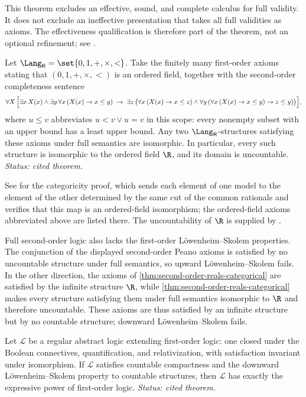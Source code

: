 This theorem excludes an effective, sound, and complete calculus for full
validity.  It does not exclude an ineffective presentation that takes all full
validities as axioms.  The effectiveness qualification is therefore part of
the theorem, not an optional refinement; see
\cite{BarwiseFeferman1985,Shapiro1991}.

\begin{theorem}
\label{thm:second-order-reals-categorical}
Let \(\Lang_{\mathsf R}=\set{0,1,+,\times,<}\).  Take the finitely many
first-order axioms stating that \((0,1,+,\times,<)\) is an ordered field,
together with the second-order completeness sentence
\[
  \forall X\,
  \Bigl[
    \exists x\,X(x)
    \land
    \exists y\,\forall x\,(X(x)\to x\le y)
    \;\to\;
    \exists z\,
    \bigl(
      \forall x\,(X(x)\to x\le z)
      \land
      \forall y\,(\forall x\,(X(x)\to x\le y)\to z\le y)
    \bigr)
  \Bigr],
\]
where \(u\le v\) abbreviates \(u<v\lor u=v\) in this scope: every nonempty
subset with an upper bound has a least upper bound.  Any two
\(\Lang_{\mathsf R}\)-structures satisfying these axioms under full
semantics are isomorphic.  In particular, every such structure is isomorphic
to the ordered field \(\R\), and its domain is uncountable.
\textit{Status: cited theorem.}
\end{theorem}

See \cite{Shapiro1991} for the categoricity proof, which sends each element
of one model to the element of the other determined by the same cut of the
common rationals and verifies that this map is an ordered-field isomorphism;
the ordered-field axioms abbreviated above are listed there.  The
uncountability of \(\R\) is supplied by \cite{Jech2003}.

Full second-order logic also lacks the first-order L\"owenheim--Skolem
properties.  The conjunction of the displayed second-order Peano axioms is
satisfied by no uncountable structure
under full semantics, so upward L\"owenheim--Skolem fails.  In the other
direction, the axioms of \cref{thm:second-order-reals-categorical} are
satisfied by the infinite structure \(\R\), while
\cref{thm:second-order-reals-categorical} makes every structure satisfying
them under full semantics isomorphic to \(\R\) and therefore uncountable.
These axioms are thus satisfied by an infinite structure but by no countable
structure; downward L\"owenheim--Skolem fails.

\begin{theorem}[Lindstr\"om]
\label{thm:lindstrom}
Let \(\mathcal L\) be a regular abstract logic extending first-order
logic: one closed under the Boolean connectives, quantification, and
relativization, with satisfaction invariant under isomorphism.  If
\(\mathcal L\) satisfies countable compactness and the downward
L\"owenheim--Skolem property to countable structures, then
\(\mathcal L\) has exactly the expressive power of first-order logic.
\textit{Status: cited theorem.}
\end{theorem}

